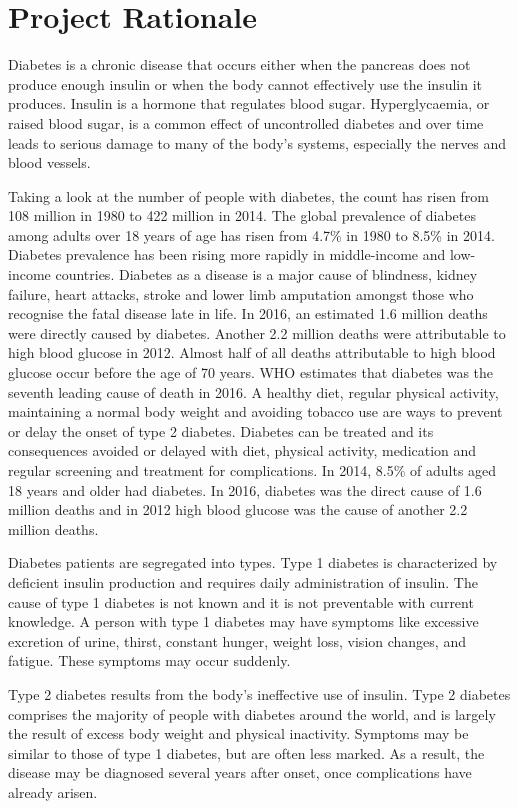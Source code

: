 \documentclass[12pt]{article}
\begin{document}
\newpage
\section{Project Rationale}

Diabetes is a chronic disease that occurs either when the pancreas does not produce enough insulin or when the body cannot effectively use the insulin it produces. Insulin is a hormone that regulates blood sugar. Hyperglycaemia, or raised blood sugar, is a common effect of uncontrolled diabetes and over time leads to serious damage to many of the body's systems, especially the nerves and blood vessels.

Taking a look at the number of people with diabetes, the count has risen from 108 million in 1980 to 422 million in 2014.
The global prevalence of diabetes among adults over 18 years of age has risen from 4.7\% in 1980 to 8.5\% in 2014. Diabetes prevalence has been rising more rapidly in middle-income and low-income countries.
Diabetes as a disease is a major cause of blindness, kidney failure, heart attacks, stroke and lower limb amputation amongst those who recognise the fatal disease late in life.
In 2016, an estimated 1.6 million deaths were directly caused by diabetes. Another 2.2 million deaths were attributable to high blood glucose in 2012. Almost half of all deaths attributable to high blood glucose occur before the age of 70 years. WHO estimates that diabetes was the seventh leading cause of death in 2016. A healthy diet, regular physical activity, maintaining a normal body weight and avoiding tobacco use are ways to prevent or delay the onset of type 2 diabetes. Diabetes can be treated and its consequences avoided or delayed with diet, physical activity, medication and regular screening and treatment for complications. In 2014, 8.5\% of adults aged 18 years and older had diabetes. In 2016, diabetes was the direct cause of 1.6 million deaths and in 2012 high blood glucose was the cause of another 2.2 million deaths.

Diabetes patients are segregated into types. Type 1 diabetes is characterized by deficient insulin production and requires daily administration of insulin. The cause of type 1 diabetes is not known and it is not preventable with current knowledge. A person with type 1 diabetes may have symptoms like excessive excretion of urine, thirst, constant hunger, weight loss, vision changes, and fatigue. These symptoms may occur suddenly.

Type 2 diabetes results from the body’s ineffective use of insulin. Type 2 diabetes comprises the majority of people with diabetes around the world, and is largely the result of excess body weight and physical inactivity. Symptoms may be similar to those of type 1 diabetes, but are often less marked. As a result, the disease may be diagnosed several years after onset, once complications have already arisen.
\end{document}
